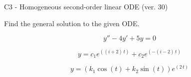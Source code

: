 \begin{exercise}
  \begin{exerciseTitle}C3 - Homogeneous second-order linear ODE (ver. 30)\end{exerciseTitle}
  \begin{exerciseStatement}
    
Find the general solution to the given ODE.

    
\[y''-4y'+5y = 0\]

  \end{exerciseStatement}
  \begin{exerciseAnswer}
    
\[y= c_{1} e^{\left(\left(i + 2\right) \, t\right)} + c_{2} e^{\left(-\left(i - 2\right) \, t\right)}\]

    
\[y= {\left(k_{1} \cos\left(t\right) + k_{2} \sin\left(t\right)\right)} e^{\left(2 \, t\right)}\]

  \end{exerciseAnswer}
\end{exercise}
